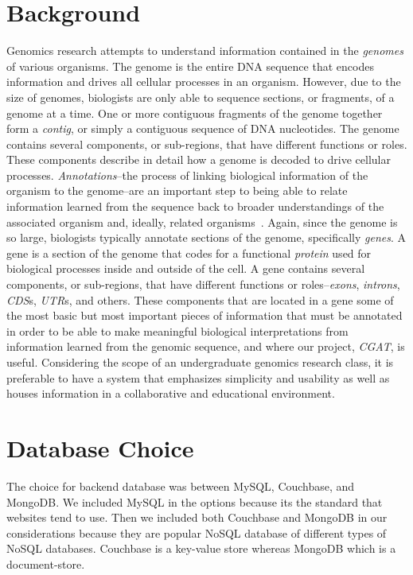 \documentclass[10pt, conference, compsocconf]{IEEEtran}
\begin{document}
\section{Background}\label{sec:background}
Genomics research attempts to understand information contained in the
\textit{genomes} of various organisms. The genome is the entire DNA sequence
that encodes information and drives all cellular processes in an organism.
However, due to the size of genomes, biologists are only able to sequence
sections, or fragments, of a genome at a time. One or more contiguous fragments
of the genome together form a \textit{contig}, or simply a contiguous sequence
of DNA nucleotides. The genome contains several components, or sub-regions,
that have different functions or roles. These components describe in detail how
a genome is decoded to drive cellular processes. \textit{Annotations}--the
process of linking biological information of the organism to the genome--are an
important step to being able to relate information learned from the sequence back
to broader understandings of the associated organism and, ideally, related
organisms~\cite{annotation}. Again, since the genome is so large, biologists
typically annotate sections of the genome, specifically \textit{genes}. A gene
is a section of the genome that codes for a functional \textit{protein} used
for biological processes inside and outside of the cell. A gene contains
several components, or sub-regions, that have different functions or
roles--\textit{exons}, \textit{introns}, \textit{CDS}s, \textit{UTR}s, and
others. These components that are located in a gene some of the most basic but
most important pieces of information that must be annotated in order to be able
to make meaningful biological interpretations from information learned from the
genomic sequence, and where our project, \textit{CGAT}, is useful. Considering
the scope of an undergraduate genomics research class, it is preferable to have
a system that emphasizes simplicity and usability as well as houses information
in a collaborative and educational environment.

\section{Database Choice}\label{sec:choice}
The choice for backend database was between MySQL, Couchbase, and MongoDB.
We included MySQL in the options because its the standard that websites tend to use. Then we included both
Couchbase and MongoDB in our considerations because they are popular NoSQL database of different types of NoSQL
databases. Couchbase is a key-value store whereas MongoDB which is a document-store.
\end{document}
